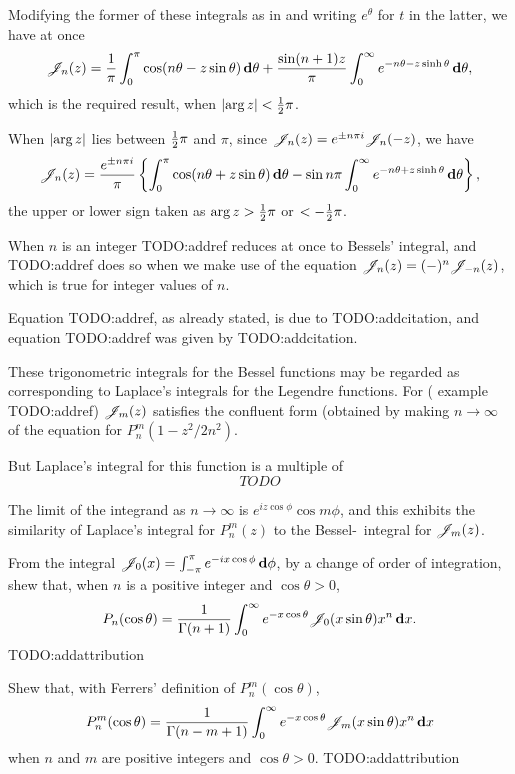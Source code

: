 \documentclass{book}
\begin{document}
Modifying the former of these integrals as in
 and writing 
$e^{\theta}$ for $t$ in the latter, we have at once
$$
\mathscr{J}_n(z)
=
\frac{1}{\pi}
\int_0^{\pi}
\cos(n\theta - z\sin\theta)
\, \mathbf{d}\theta
+
\frac{\sin(n+1)z}{\pi}
\int_0^{\infty}
e^{-n\theta - z\sinh\theta}
\, \mathbf{d} \theta,
$$
which is the required result, when
$\left| \arg z \right| < \frac{1}{2} \pi$.

When $\left|  \arg z  \right|$ lies between $\frac{1}{2} \pi$ and $\pi$, since 
$\mathscr{J}_n(z) = e^{\pm n\pi i} \mathscr{J}_n(-z)$, we have
\begin{equation}
  \mathscr{J}_n(z)
  =
  \frac{e^{\pm n \pi i}}{\pi}
  \left\{ 
    \int_0^{\pi} \cos(n\theta + z\sin\theta) \, \mathbf{d}\theta
    -
    \sin n\pi \int_0^{\infty} e^{-n\theta + z\sinh\theta} \, \mathbf{d}\theta
   \right\},
\end{equation}
the upper or lower sign taken as
$\arg z > \frac{1}{2} \pi$ or $< -\frac{1}{2} \pi$.

When $n$ is an integer TODO:addref reduces at once to Bessels'
integral, and TODO:addref does so when we make use of the equation 
$\mathscr{J}_n(z) = (-)^n \mathscr{J}_{-n}(z)$, which is true for integer values of $n$.

% 
% 
Equation TODO:addref, as already stated, is due to TODO:addcitation,
and equation TODO:addref was given by TODO:addcitation.

These trigonometric integrals for the Bessel functions may be regarded
as corresponding to Laplace's integrals for the Legendre functions.
For ( example TODO:addref)
$\mathscr{J}_m(z)$ satisfies the confluent form (obtained by making 
$n \rightarrow \infty$ of the equation for
$P_n^m(1-z^2/2n^2)$.

But Laplace's integral for this function is a multiple of 
$$
TODO
$$

The limit of the integrand as $n \rightarrow \infty$ is 
$e^{iz\cos\phi}\cos m\phi$, and this exhibits the similarity of
Laplace's integral for $P_n^m(z)$ to the Bessel-\Schlafli\ integral for 
$\mathscr{J}_m(z)$.
\begin{wandwexample}
  From the integral
  $\mathscr{J}_0(x) = \int_{-\pi}^{\pi} e^{-ix\cos\phi}\, \mathbf{d}\phi$, by a
  change of order of integration, shew that, when $n$ is a positive
  integer and $\cos\theta > 0$,
  $$
  P_n(\cos\theta)
  =
  \frac{1}{\Gamma(n+1)}
  \int_0^{\infty}
  e^{-x\cos\theta}
  \mathscr{J}_0(x\sin\theta)
  x^n
  \, \mathbf{d} x.
  $$
  TODO:addattribution
\end{wandwexample}
\begin{wandwexample}
  Shew that, with Ferrers' definition of $P_n^m(\cos\theta)$,
  $$
  P_n^m(\cos\theta)
  =
  \frac{1}{\Gamma(n-m+1)}
  \int_0^{\infty}
  e^{-x\cos\theta}
  \mathscr{J}_m(x\sin\theta)
  x^n
  \, \mathbf{d} x
  $$
  when $n$ and $m$ are positive integers and
  $\cos\theta > 0$.
  TODO:addattribution
\end{wandwexample}
\end{document}

